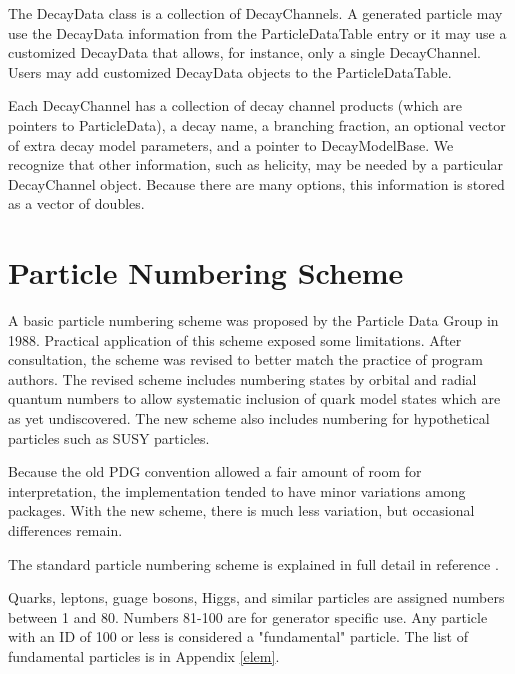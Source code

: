 The DecayData class is a collection of DecayChannels.
A generated particle may use the DecayData information from the
ParticleDataTable entry or it may use a customized DecayData that
allows, for instance, only a single DecayChannel.
Users may add customized DecayData objects to the ParticleDataTable.

Each DecayChannel has a collection of decay channel products
(which are pointers to ParticleData), a decay name, a branching fraction,
an optional vector of extra decay model parameters, and a 
pointer to DecayModelBase.  We recognize that other information, such
as helicity, may be needed by a particular DecayChannel object.
Because there are many options, 
this information is stored as a vector of doubles.  

\section { Particle Numbering Scheme }

A basic particle numbering scheme was proposed by the Particle Data
Group in 1988\cite{pdg88}.  
Practical application of this scheme exposed some limitations.
After consultation\cite{knowles}, the scheme was revised to 
better match the practice of program authors.  The revised scheme
includes numbering states by orbital and radial quantum numbers
to allow systematic inclusion of quark model states which are
as yet undiscovered.  The new scheme also includes numbering for
hypothetical particles such as SUSY particles.

Because the old PDG convention allowed a fair amount of room for 
interpretation,
the implementation tended to have minor variations among packages.
With the new scheme, there is much less variation, but occasional differences
remain.  

The standard particle numbering scheme is explained in full detail in
reference \cite{newscheme}.

Quarks, leptons, guage bosons, Higgs, and similar particles are assigned
numbers between 1 and 80.  
Numbers 81-100 are for generator specific use.
Any particle with an ID of 100 or less is considered a "fundamental" particle.
The list of fundamental particles is in Appendix \ref{elem}.

